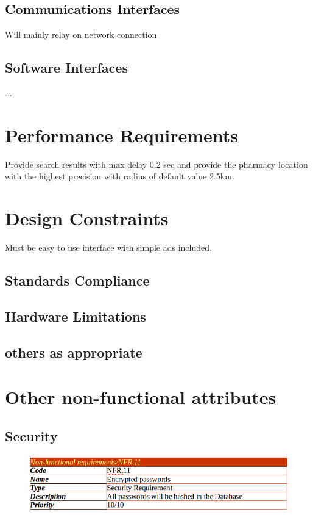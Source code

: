 \documentclass[]{article}
\begin{document}
\subsection{Communications Interfaces}
Will mainly relay on network connection
\subsection{Software Interfaces}
... 
\section{Performance Requirements}
Provide search results with max delay 0.2 sec 
and provide the pharmacy location with the highest precision with radius of default value 2.5km.
\section{Design Constraints}
Must be easy to use interface with simple ads included.
\subsection{ Standards Compliance}
\subsection{ Hardware Limitations}
\subsection{ others as appropriate}

\section{Other non-functional attributes}

\subsection {Security}

\begin{figure}[H]
\centering
\includegraphics[scale=0.4]{./nonf/01}
\end{figure}
\end{document}
